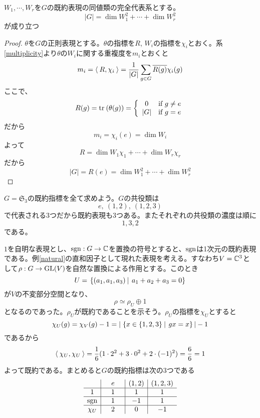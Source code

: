 \documentclass{ltjsarticle}
\begin{document}
\begin{prop}\label{dim_formula}
  $W_1,\cdots,W_r$を$G$の既約表現の同値類の完全代表系とする。
  \[
  |G|=\dim W_1^2+\cdots +\dim W_r^2  
  \]
  が成り立つ
\end{prop}

\begin{proof}
  $\theta$を$G$の正則表現とする。$\theta$の指標を$R$, $W_i$の指標を$\chi_i$とおく。系\ref{multiplicity}より$\theta$の$W_i$に関する重複度を$m_i$とおくと
  \[
  m_i=\langle\:R,\chi_i\:\rangle=\frac{1}{|G|}\sum_{g\in G}\overline{R(g)}\chi_i(g)
  \]
  ここで、
  \[
  R(g)=\text{tr}\:(\theta(g))=\left\{\begin{array}{cl}
    0 & \text{if $g\neq e$}\\
    |G| & \text{if $g=e$}
  \end{array}\right.  
  \]
  だから
  \[
  m_i=\chi_i(e)=\dim W_i  
  \]
  よって
  \[
  R=\dim W_1\chi_1+\cdots +\dim W_r\chi_r  
  \]
  だから
  \[
  |G|=R(e)=\dim W_1^2+\cdots +\dim W_r^2  
  \]
\end{proof}

\begin{eg}\label{S3}
  $G=\mathfrak{S}_3$の既約指標を全て求めよう。$G$の共役類は
  \[
  e,\:(1,2),\:(1,2,3)  
  \]
  で代表される3つだから既約表現も3つある。またそれぞれの共役類の濃度は順に
  \[
  1,3,2  
  \]
  である。

  $1$を自明な表現とし、$\mathrm{sgn}:G\rightarrow \mathbb{C}$を置換の符号とすると、$\mathrm{sgn}$は1次元の既約表現である。例\ref{natural}の直和因子として現れた表現を考える。すなわち$V=\mathbb{C}^3$として$\rho:G\rightarrow\mathrm{GL}(V)$を自然な置換による作用とする。このとき
  \[
  U=\left.\left\{(a_1,a_1,a_3) \: \right| \: a_1+a_2+a_3=0\right\}  
  \]
  が$V$の不変部分空間となり、
  \[
  \rho\simeq\rho_U\oplus 1  
  \]
  となるのであった。$\rho_U$が既約であることを示そう。$\rho_U$の指標を$\chi_U$とすると
  \[
  \chi_U(g)=\chi_V(g)-1=|\left.\left\{x\in\{1,2,3\} \: \right| \: gx=x\right\}|-1  
  \]
  であるから
  \[
  \langle\:\chi_U,\chi_U\:\rangle=\frac{1}{6}(1\cdot 2^2+3\cdot 0^2+2\cdot (-1)^2)=\frac{6}{6}=1 
  \]
  よって既約である。まとめると$G$の既約指標は次の3つである
  \[
  \begin{array}{c|c|c|c}
        &\quad e\quad & (1,2) & (1,2,3) \\ \hline
    1   &      1      &   1   &    1    \\ \hline
  \mathrm{sgn}  &      1      &   -1  &    1    \\ \hline
  \chi_U&      2      &   0   &    -1
  \end{array}
  \]
\end{eg}
\end{document}
